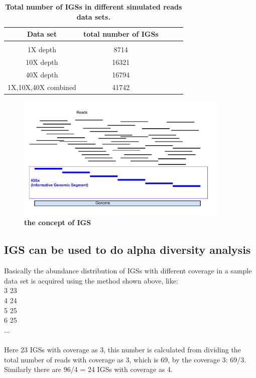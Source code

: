 \documentclass[12pt]{report}
\begin{document}
\begin{table}[!ht]
\caption{
\bf{Total number of IGSs in different simulated reads data sets.}
}
\begin{tabular}{ |c | c |c| c|c| }
Data set & total number of IGSs \\
\hline \\
1X depth                   & 8714  \\
10X depth                  & 16321  \\
40X depth                  & 16794 \\
1X,10X,40X combined        & 41742 \\
\end{tabular}
\begin{flushleft}
\end{flushleft}
\label{table:IGSs}
\end{table}


\begin{figure}[!ht]
\centerline{\includegraphics[width=4in]{./figures/IGSs_figure.pdf}}
\caption{\bf the concept of IGS}
\label{fig:IGS}
\end{figure}





\subsection{IGS can be used to do alpha diversity analysis}

Basically the abundance distribution of IGSs with different coverage in a sample data set is acquired using the method shown above, like:
\\
3 23\\
4 24\\
5 25\\
6 25\\
...\\
\\
Here 23 IGSs with coverage as 3, this number is calculated from dividing the total number of reads with coverage as 3, which is 69, by the coverage 3: 69/3. Similarly there are 96/4 = 24 IGSs with coverage as 4.
\end{document}
